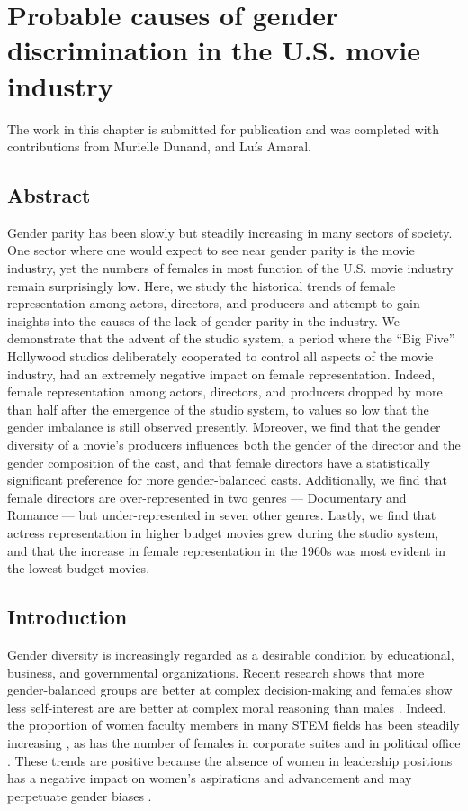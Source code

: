 \chapter{Probable causes of gender discrimination in the U.S. movie industry}
\label{ch:movies}

The work in this chapter is submitted for publication and was completed with contributions from
Murielle Dunand, and
Lu\'{i}s Amaral.


\section{Abstract}

Gender parity has been slowly but steadily increasing in many sectors of society. One sector where one would expect to see near gender parity is the movie industry, yet the numbers of females in most function of the U.S. movie industry remain surprisingly low. Here, we study the historical trends of female representation among actors, directors, and producers and attempt to gain insights into the causes of the lack of gender parity in the industry. We demonstrate that the advent of the studio system, a period where the ``Big Five'' Hollywood studios deliberately cooperated to control all aspects of the movie industry, had an extremely negative impact on female representation. Indeed, female representation among actors, directors, and producers dropped by more than half after the emergence of the studio system, to values so low that the gender imbalance is still observed presently. Moreover, we find that the gender diversity of a movie's producers influences both the gender of the director and the gender composition of the cast, and that female directors have a statistically significant preference for more gender-balanced casts. Additionally, we find that female directors are over-represented in two genres --- Documentary and Romance --- but under-represented in seven other genres. Lastly, we find that actress representation in higher budget movies grew during the studio system, and that the increase in female representation in the 1960s was most evident in the lowest budget movies.

\clearpage

\section{Introduction}

Gender diversity is increasingly regarded as a desirable condition by educational, business, and governmental organizations. Recent research shows that more gender-balanced groups are better at complex decision-making \cite{Woolley2010} and females show less self-interest are are better at complex moral reasoning than males \cite{Bart2013}. Indeed, the proportion of women faculty members in many STEM fields has been steadily increasing \cite{Duch2012}, as has the number of females in corporate suites and in political office \cite{Zaichkowsky2014,Jalalzai2013}. These trends are positive because the absence of women in leadership positions has a negative impact on women's aspirations and advancement and may perpetuate gender biases \cite{Dean2008}.

